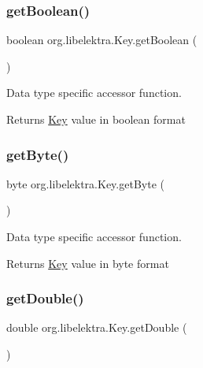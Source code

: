 \subsubsection{\texorpdfstring{getBoolean()}{getBoolean()}}
{\footnotesize\ttfamily boolean org.\+libelektra.\+Key.\+get\+Boolean (\begin{DoxyParamCaption}{ }\end{DoxyParamCaption})\hspace{0.3cm}{\ttfamily [inline]}}



Data type specific accessor function. 

\begin{DoxyReturn}{Returns}
\mbox{\hyperlink{classorg_1_1libelektra_1_1Key}{Key}} value in boolean format 
\end{DoxyReturn}
\mbox{\label{classorg_1_1libelektra_1_1Key_ad29faef52eb7ceb2940d4960a5717b5c}} 
\subsubsection{\texorpdfstring{getByte()}{getByte()}}
{\footnotesize\ttfamily byte org.\+libelektra.\+Key.\+get\+Byte (\begin{DoxyParamCaption}{ }\end{DoxyParamCaption})\hspace{0.3cm}{\ttfamily [inline]}}



Data type specific accessor function. 

\begin{DoxyReturn}{Returns}
\mbox{\hyperlink{classorg_1_1libelektra_1_1Key}{Key}} value in byte format 
\end{DoxyReturn}
\mbox{\label{classorg_1_1libelektra_1_1Key_a64f1c2bc6776b8f08d8e50554713d07a}} 
\subsubsection{\texorpdfstring{getDouble()}{getDouble()}}
{\footnotesize\ttfamily double org.\+libelektra.\+Key.\+get\+Double (\begin{DoxyParamCaption}{ }\end{DoxyParamCaption})\hspace{0.3cm}{\ttfamily [inline]}}



